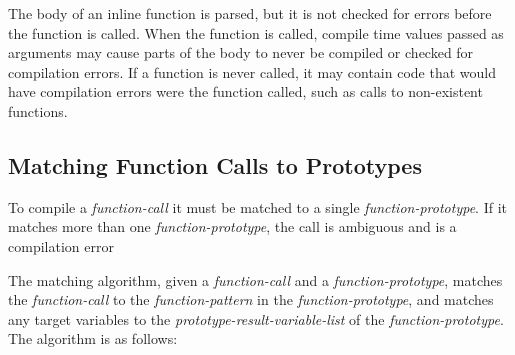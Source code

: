 \documentclass[12pt]{article}
\begin{document}
The body of an inline function is parsed, but it is not checked for
errors before the function is called.  When the function is called,
compile time values passed as arguments may cause parts of the body
to never be compiled or checked for compilation errors.  If a function
is never called, it may contain code that would have compilation errors
were the function called, such as calls to non-existent functions.

\subsection{Matching Function Calls to Prototypes}
\label{MATCHING-FUNCTION-CALLS-TO-PROTOTYPES}

To compile a {\em function-call} it must be matched to a
single {\em function-prototype}.  If it matches more than one
{\em function-prototype}, the call is ambiguous and is a compilation error

The matching algorithm, given a {\em function-call} and a
{\em function-prototype}, matches the {\em function-call}
to the {\em function-pattern} in the {\em function-prototype},
and matches any target variables to the {\em prototype-result-variable-list}
of the {\em function-prototype}.  The algorithm is as follows:
\end{document}
